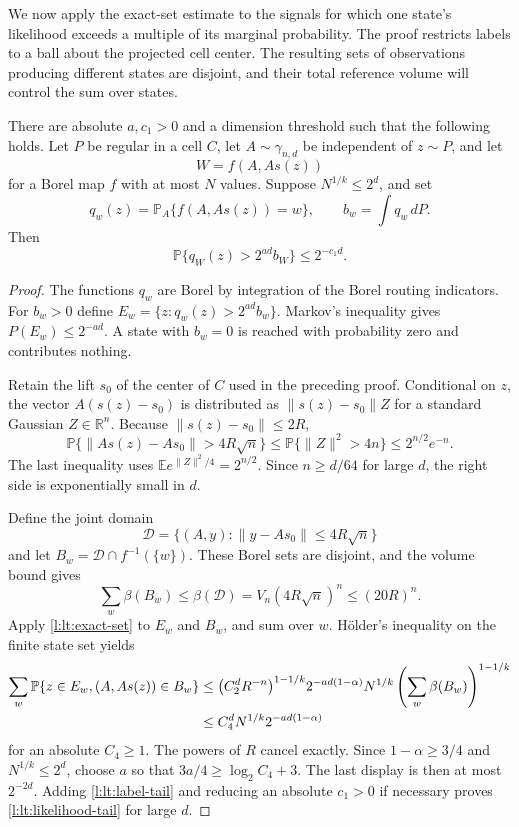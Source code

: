 We now apply the exact-set estimate to the signals for which one
state's likelihood exceeds a multiple of its marginal probability.
The proof restricts labels to a ball about the projected cell center.
The resulting sets of observations producing different states are
disjoint, and their total reference volume will control the sum over states.

\begin{lemma}
\label{lem:l-lt-likelihood}
There are absolute $a,c_1>0$ and a dimension threshold such that the
following holds.  Let $P$ be regular in a cell $C$, let
$A\sim\gamma_{n,d}$ be independent of $z\sim P$, and let
\[
 W=f(A,As(z))
\]
for a Borel map $f$ with at most $N$ values.  Suppose
$N^{1/k}\le2^d$, and set
\[
 q_w(z)=\mathbb P_A\{f(A,As(z))=w\},\qquad
 b_w=\int q_w\,dP.
\]
Then
\begin{equation}\label{l:lt:likelihood-tail}
 \mathbb P\{q_W(z)>2^{ad}b_W\}\le2^{-c_1d}.
\end{equation}
\end{lemma}
\begin{proof}
The functions $q_w$ are Borel by integration of the Borel routing
indicators.  For $b_w>0$ define
$E_w=\{z:q_w(z)>2^{ad}b_w\}$.  Markov's inequality gives
$P(E_w)\le2^{-ad}$.  A state with $b_w=0$ is reached with probability
zero and contributes nothing.

Retain the lift $s_0$ of the center of $C$ used in the preceding
proof.  Conditional on $z$, the vector $A(s(z)-s_0)$ is distributed
as $\|s(z)-s_0\|Z$ for a standard Gaussian $Z\in\mathbb R^n$.
Because $\|s(z)-s_0\|\le2R$,
\begin{equation}\label{l:lt:label-tail}
 \mathbb P\{\|As(z)-As_0\|>4R\sqrt n\}
 \le \mathbb P\{\|Z\|^2>4n\}
 \le 2^{n/2}e^{-n}.
\end{equation}
The last inequality uses
$\mathbb E e^{\|Z\|^2/4}=2^{n/2}$.  Since $n\ge d/64$ for large
$d$, the right side is exponentially small in $d$.

Define the joint domain
\[
 \mathcal D=\{(A,y):\|y-As_0\|\le4R\sqrt n\}
\]
and let $B_w=\mathcal D\cap f^{-1}(\{w\})$.  These Borel sets are
disjoint, and the volume bound gives
\[
 \sum_w\beta(B_w)\le\beta(\mathcal D)
 =V_n(4R\sqrt n)^n\le(20R)^n.
\]
Apply \eqref{l:lt:exact-set} to $E_w$ and $B_w$, and sum over $w$.
H\"older's inequality on the finite state set yields
\begin{align}
 \sum_w\mathbb P\{z\in E_w,(A,As(z))\in B_w\}
 &\le \bigl(C_2^dR^{-n}\bigr)^{1-1/k}
       2^{-ad(1-\alpha)}
       N^{1/k}\left(\sum_w\beta(B_w)\right)^{1-1/k}\notag\\
 &\le C_4^dN^{1/k}2^{-ad(1-\alpha)}
 \label{l:lt:width-tail}
\end{align}
for an absolute $C_4\ge1$.  The powers of $R$ cancel exactly.
Since $1-\alpha\ge3/4$ and $N^{1/k}\le2^d$, choose $a$ so that
$3a/4\ge\log_2 C_4+3$.  The last display is then at most $2^{-2d}$.
Adding \eqref{l:lt:label-tail} and reducing an absolute $c_1>0$ if
necessary proves \eqref{l:lt:likelihood-tail} for large $d$.
\end{proof}

